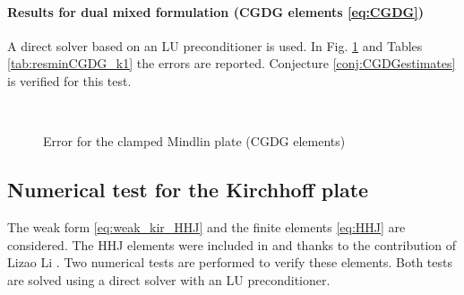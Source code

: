 \paragraph{Results for dual mixed formulation (CGDG elements \eqref{eq:CGDG})}
A direct solver based on an LU preconditioner is used.
In Fig. \ref{fig:errorCGDG} and Tables \ref{tab:resminCGDG_k1} the errors are reported. Conjecture \ref{conj:CGDGestimates} is verified for this test. 

\begin{figure}[h]%
	\centering
	\hspace{8pt}%
	 \\
	\hspace{8pt}%
	\caption{Error for the clamped Mindlin plate (CGDG elements)}%
	\label{fig:errorCGDG}%
\end{figure}




\subsection{Numerical test for the Kirchhoff plate}
The weak form \eqref{eq:weak_kir_HHJ} and the finite elements \eqref{eq:HHJ} are considered. The HHJ elements were included in {} and {} thanks to the contribution of Lizao Li \cite{li2018regge}. Two numerical tests are performed to verify these elements. Both tests are solved using a direct solver with an LU preconditioner. \\ 

